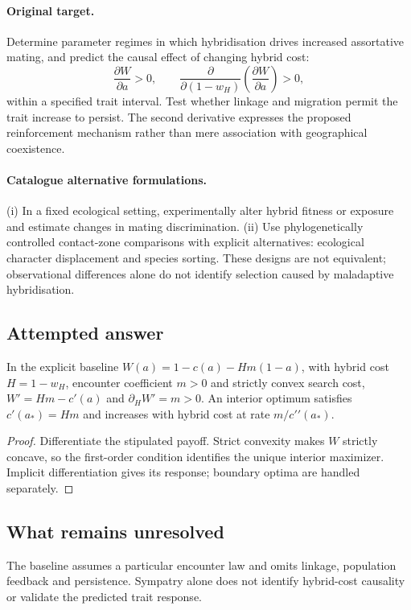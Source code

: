 \documentclass[11pt]{article}
\begin{document}
\paragraph{Original target.}
Determine parameter regimes in which hybridisation drives increased assortative mating, and predict the causal effect of changing hybrid cost:
\[
\frac{\partial W}{\partial a}>0,
\qquad
\frac{\partial}{\partial(1-w_H)}\left(\frac{\partial W}{\partial a}\right)>0,
\]
within a specified trait interval. Test whether linkage and migration permit the trait increase to persist. The second derivative expresses the proposed reinforcement mechanism rather than mere association with geographical coexistence.
\paragraph{Catalogue alternative formulations.}
(i) In a fixed ecological setting, experimentally alter hybrid fitness or exposure and estimate changes in mating discrimination. (ii) Use phylogenetically controlled contact-zone comparisons with explicit alternatives: ecological character displacement and species sorting. These designs are not equivalent; observational differences alone do not identify selection caused by maladaptive hybridisation.
\subsection{Attempted answer}
\begin{proposition}
In the explicit baseline $W(a)=1-c(a)-Hm(1-a)$, with hybrid cost $H=1-w_H$, encounter coefficient $m>0$ and strictly convex search cost, $W\prime=Hm-c\prime(a)$ and $\partial_H W\prime=m>0$. An interior optimum satisfies $c\prime(a_*)=Hm$ and increases with hybrid cost at rate $m/c\prime\prime(a_*)$.
\end{proposition}
\begin{proof}
Differentiate the stipulated payoff. Strict convexity makes $W$ strictly concave, so the first-order condition identifies the unique interior maximizer. Implicit differentiation gives its response; boundary optima are handled separately.
\end{proof}
\subsection{What remains unresolved}
The baseline assumes a particular encounter law and omits linkage, population feedback and persistence. Sympatry alone does not identify hybrid-cost causality or validate the predicted trait response.
\end{document}
